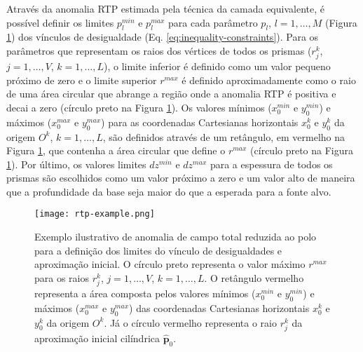 Através da anomalia RTP estimada pela técnica da  camada equivalente, é possível definir os limites $p_{l}^{min}$ e $p_{l}^{max}$ para cada parâmetro $p_{l}$, $l = 1, \dots, M$ (Figura \ref{fig:rtp}) dos vínculos de desigualdade (Eq. \ref{eq:inequality-constraints}).
Para os parâmetros que representam os raios dos vértices de todos os prismas ($r^{k}_{j}$, $j=1,\dots , V$, $k=1,\dots ,L$), o limite inferior é definido como um valor pequeno próximo de zero e o limite superior $ r^{max} $ é definido aproximadamente como o raio de uma área circular que abrange a região onde a anomalia RTP é positiva e decai a zero (círculo preto na Figura \ref{fig:rtp}).
Os valores mínimos ($ x_0^{min} $ e $ y_0^{min} $) e máximos ($ x_0^{max} $ e $ y_0^{max} $) para as coordenadas Cartesianas horizontais $ x_0^k $ e $ y_0^k $ da origem $ O^k $, $k=1,\dots ,L$, são definidos através de um retângulo, em vermelho na Figura \ref{fig:rtp}, que contenha a área circular que define o $ r^{max} $ (círculo preto na Figura \ref{fig:rtp}).
Por último, os valores limites $ dz^{min} $ e $ dz^{max} $ para a espessura de todos os prismas são escolhidos como um valor próximo a zero e um valor alto de maneira que a profundidade da base seja maior do que a esperada para a fonte alvo.

\begin{figure}[!htb]
	\centering
	\texttt{[image: rtp-example.png]}
	\caption{Exemplo ilustrativo de anomalia de campo total reduzida ao polo para a definição dos limites do vínculo de desigualdades e aproximação inicial. O círculo preto representa o valor máximo $ r^{max} $ para os raios $r_j^k$, $j=1,\dots ,V$, $k=1,\dots ,L$. O retângulo vermelho representa a área composta pelos valores mínimos ($ x_0^{min} $ e $ y_0^{min} $) e máximos ($ x_0^{max} $ e $ y_0^{max} $) das coordenadas Cartesianas horizontais $ x_0^k $ e $ y_0^k $ da origem $ O^k $. Já o círculo vermelho representa o raio $r_j^k$ da aproximação inicial cilíndrica $ \hat{\mathbf{p}}_0 $.}
	\label{fig:rtp}
\end{figure}

